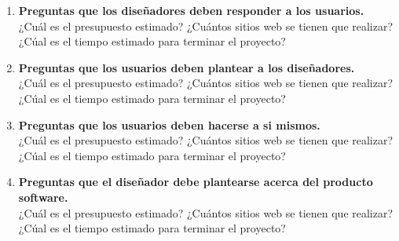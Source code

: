 \begin{enumerate}
  \item \textbf{Preguntas que los diseñadores deben responder a los usuarios.} \\
    ¿Cuál es el presupuesto estimado?
    ¿Cuántos sitios web se tienen que realizar?
    ¿Cúal es el tiempo estimado para terminar el proyecto?
    
  \item \textbf{Preguntas que los usuarios deben plantear a los diseñadores.} \\
     ¿Cuál es el presupuesto estimado?
    ¿Cuántos sitios web se tienen que realizar?
    ¿Cúal es el tiempo estimado para terminar el proyecto?
  \item \textbf{Preguntas que los usuarios deben hacerse a si mismos.} \\
     ¿Cuál es el presupuesto estimado?
    ¿Cuántos sitios web se tienen que realizar?
    ¿Cúal es el tiempo estimado para terminar el proyecto?
  \item \textbf{Preguntas que el diseñador debe plantearse acerca del producto software.} \\
      ¿Cuál es el presupuesto estimado?
    ¿Cuántos sitios web se tienen que realizar?
    ¿Cúal es el tiempo estimado para terminar el proyecto?
\end{enumerate}
